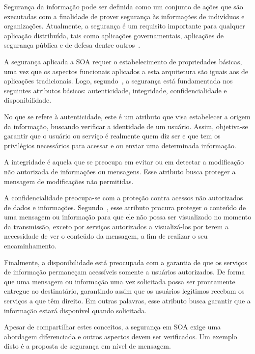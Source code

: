 Segurança da informação pode ser definida como um conjunto de ações que são executadas com a finalidade de prover segurança às informações de indivíduos e organizações. Atualmente, a segurança é um requisito importante para qualquer aplicação distribuída, tais como aplicações governamentais, aplicações de segurança pública e de defesa dentre outros~\cite{Bertino2010}.

A segurança aplicada a SOA requer o estabelecimento de propriedades básicas, uma vez que os aspectos funcionais aplicados a esta arquitetura são iguais aos de aplicações tradicionais.  Logo, segundo~\cite{Verissimo2001}, a segurança está fundamentada nos seguintes atributos básicos: autenticidade, integridade, confidencialidade e disponibilidade.

No que se refere à autenticidade, este é um atributo que visa estabelecer a origem da informação, buscando verificar a identidade de um usuário. Assim, objetiva-se garantir que o usuário ou serviço é realmente quem diz ser e que tem os privilégios necessários para acessar e ou enviar uma determinada informação.

A integridade é aquela que se preocupa em evitar ou em detectar a modificação não autorizada de informações ou mensagens. Esse atributo busca proteger a mensagem de modificações não permitidas.

A confidencialidade preocupa-se com a proteção contra acessos não autorizados de dados e informações. Segundo~\cite{Bertino2010}, esse atributo procura proteger o conteúdo de uma mensagem ou informação  para que ele não possa ser visualizado no momento da transmissão, exceto por serviços autorizados a visualizá-los por terem a necessidade de ver o conteúdo da mensagem, a fim de realizar o seu encaminhamento.

Finalmente, a disponibilidade está preocupada com a garantia de que os serviços de informação permaneçam acessíveis somente a usuários autorizados. De forma que uma mensagem ou informação uma vez solicitada possa ser prontamente entregue ao destinatário, garantindo assim que os usuários legítimos recebam os serviços a que têm direito. Em outras palavras, esse atributo busca garantir que a informação estará disponível quando solicitada.

Apesar de compartilhar estes conceitos,  a segurança em SOA exige uma abordagem  diferenciada e outros aspectos devem ser verificados. Um exemplo disto é a proposta de segurança em nível de mensagem.

